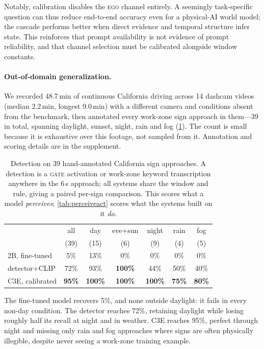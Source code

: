 \documentclass[journal]{IEEEtran}
\begin{document}
Notably, calibration disables the \textsc{ego} channel entirely.  A seemingly task-specific question can thus reduce end-to-end accuracy even for a physical-AI world model; the cascade performs better when direct evidence and temporal structure infer state.  This reinforces that prompt availability is not evidence of prompt reliability, and that channel selection must be calibrated alongside window constants.

\paragraph{Out-of-domain generalization.}  We recorded 48.7\,min of continuous California driving across 14 dashcam videos (median 2.2\,min, longest 9.0\,min) with a different camera and conditions absent from the benchmark, then annotated every work-zone sign approach in them---39 in total, spanning daylight, sunset, night, rain and fog (\cref{tab:ood}).  The count is small because it is exhaustive over this footage, not sampled from it.  Annotation and scoring details are in the supplement.

\begin{table}[t]
\centering
\caption{Detection on 39 hand-annotated California sign approaches.  A detection is a \textsc{gate} activation or work-zone keyword transcription anywhere in the 6\,s approach; all systems share the window and rule, giving a paired per-sign comparison.  This scores what a model \emph{perceives}; \cref{tab:perceiveact} scores what the systems built on it \emph{do}.}
\label{tab:ood}
\footnotesize
\setlength{\tabcolsep}{3.5pt}
\begin{tabular}{@{}lcccccc@{}}
\toprule
 & all & day & eve+sun & night & rain & fog \\
 & (39) & (15) & (6) & (9) & (4) & (5) \\
\midrule
2B, fine-tuned & 5\% & 13\% & 0\% & 0\% & 0\% & 0\% \\
detector+CLIP & 72\% & 93\% & \textbf{100\%} & 44\% & 50\% & 40\% \\
C3E, calibrated & \textbf{95\%} & \textbf{100\%} & \textbf{100\%} & \textbf{100\%} & \textbf{75\%} & \textbf{80\%} \\
\bottomrule
\end{tabular}
\end{table}

The fine-tuned model recovers 5\%, and none outside daylight: it fails in every non-day condition.  The detector reaches 72\%, retaining daylight while losing roughly half its recall at night and in weather.  C3E reaches 95\%, perfect through night and missing only rain and fog approaches where signs are often physically illegible, despite never seeing a work-zone training example.
\end{document}
